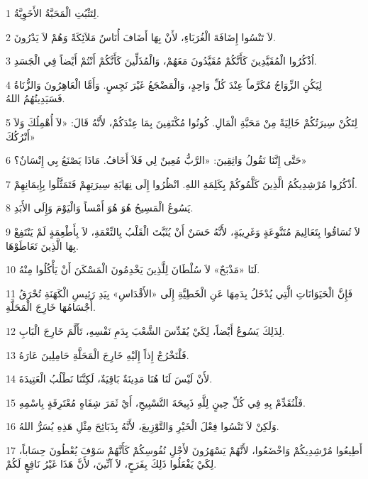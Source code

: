 \par 1 لِتَثْبُتِ الْمَحَبَّةُ الأَخَوِيَّةُ.
\par 2 لاَ تَنْسُوا إِضَافَةَ الْغُرَبَاءِ، لأَنْ بِهَا أَضَافَ أُنَاسٌ مَلاَئِكَةً وَهُمْ لاَ يَدْرُونَ.
\par 3 اُذْكُرُوا الْمُقَيَّدِينَ كَأَنَّكُمْ مُقَيَّدُونَ مَعَهُمْ، وَالْمُذَلِّينَ كَأَنَّكُمْ أَنْتُمْ أَيْضاً فِي الْجَسَدِ.
\par 4 لِيَكُنِ الزِّوَاجُ مُكَرَّماً عِنْدَ كُلِّ وَاحِدٍ، وَالْمَضْجَعُ غَيْرَ نَجِسٍ. وَأَمَّا الْعَاهِرُونَ وَالزُّنَاةُ فَسَيَدِينُهُمُ اللهُ.
\par 5 لِتَكُنْ سِيرَتُكُمْ خَالِيَةً مِنْ مَحَبَّةِ الْمَالِ. كُونُوا مُكْتَفِينَ بِمَا عِنْدَكُمْ، لأَنَّهُ قَالَ: «لاَ أُهْمِلُكَ وَلاَ أَتْرُكُكَ»
\par 6 حَتَّى إِنَّنَا نَقُولُ وَاثِقِينَ: «الرَّبُّ مُعِينٌ لِي فَلاَ أَخَافُ. مَاذَا يَصْنَعُ بِي إِنْسَانٌ؟»
\par 7 اُذْكُرُوا مُرْشِدِيكُمُ الَّذِينَ كَلَّمُوكُمْ بِكَلِمَةِ اللهِ. انْظُرُوا إِلَى نِهَايَةِ سِيرَتِهِمْ فَتَمَثَّلُوا بِإِيمَانِهِمْ.
\par 8 يَسُوعُ الْمَسِيحُ هُوَ هُوَ أَمْساً وَالْيَوْمَ وَإِلَى الأَبَدِ.
\par 9 لاَ تُسَاقُوا بِتَعَالِيمَ مُتَنَّوِعَةٍ وَغَرِيبَةٍ، لأَنَّهُ حَسَنٌ أَنْ يُثَبَّتَ الْقَلْبُ بِالنِّعْمَةِ، لاَ بِأَطْعِمَةٍ لَمْ يَنْتَفِعْ بِهَا الَّذِينَ تَعَاطَوْهَا.
\par 10 لَنَا «مَذْبَحٌ» لاَ سُلْطَانَ لِلَّذِينَ يَخْدِمُونَ الْمَسْكَنَ أَنْ يَأْكُلُوا مِنْهُ.
\par 11 فَإِنَّ الْحَيَوَانَاتِ الَّتِي يُدْخَلُ بِدَمِهَا عَنِ الْخَطِيَّةِ إِلَى «الأَقْدَاسِ» بِيَدِ رَئِيسِ الْكَهَنَةِ تُحْرَقُ أَجْسَامُهَا خَارِجَ الْمَحَلَّةِ.
\par 12 لِذَلِكَ يَسُوعُ أَيْضاً، لِكَيْ يُقَدِّسَ الشَّعْبَ بِدَمِ نَفْسِهِ، تَأَلَّمَ خَارِجَ الْبَابِ.
\par 13 فَلْنَخْرُجْ إِذاً إِلَيْهِ خَارِجَ الْمَحَلَّةِ حَامِلِينَ عَارَهُ.
\par 14 لأَنْ لَيْسَ لَنَا هُنَا مَدِينَةٌ بَاقِيَةٌ، لَكِنَّنَا نَطْلُبُ الْعَتِيدَةَ.
\par 15 فَلْنُقَدِّمْ بِهِ فِي كُلِّ حِينٍ لِلَّهِ ذَبِيحَةَ التَّسْبِيحِ، أَيْ ثَمَرَ شِفَاهٍ مُعْتَرِفَةٍ بِاسْمِهِ.
\par 16 وَلَكِنْ لاَ تَنْسُوا فِعْلَ الْخَيْرِ وَالتَّوْزِيعَ، لأَنَّهُ بِذَبَائِحَ مِثْلِ هَذِهِ يُسَرُّ اللهُ.
\par 17 أَطِيعُوا مُرْشِدِيكُمْ وَاخْضَعُوا، لأَنَّهُمْ يَسْهَرُونَ لأَجْلِ نُفُوسِكُمْ كَأَنَّهُمْ سَوْفَ يُعْطُونَ حِسَاباً، لِكَيْ يَفْعَلُوا ذَلِكَ بِفَرَحٍ، لاَ آنِّينَ، لأَنَّ هَذَا غَيْرُ نَافِعٍ لَكُمْ.
